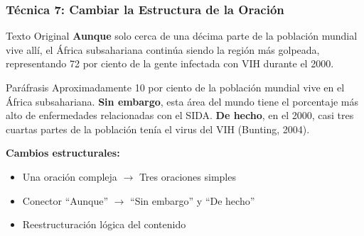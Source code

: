 \documentclass[aspectratio=169]{beamer}
\begin{document}
\begin{frame}
	\frametitle{Técnica 7: Cambiar la Estructura de la Oración}
	
	\begin{exampleblock}{Texto Original}
		\small
		\textbf{Aunque} solo cerca de una décima parte de la población mundial vive allí, el África subsahariana continúa siendo la región más golpeada, representando 72 por ciento de la gente infectada con VIH durante el 2000.
	\end{exampleblock}
	
	\vspace{0.5em}
	
	\begin{exampleblock}{Paráfrasis}
		\small
		Aproximadamente 10 por ciento de la población mundial vive en el África subsahariana. \textbf{Sin embargo}, esta área del mundo tiene el porcentaje más alto de enfermedades relacionadas con el SIDA. \textbf{De hecho}, en el 2000, casi tres cuartas partes de la población tenía el virus del VIH (Bunting, 2004).
	\end{exampleblock}
	
	\vspace{0.5em}
	
	\textbf{Cambios estructurales:}
	\begin{itemize}
		\item Una oración compleja $\rightarrow$ Tres oraciones simples
		\item Conector ``Aunque'' $\rightarrow$ ``Sin embargo'' y ``De hecho''
		\item Reestructuración lógica del contenido
	\end{itemize}
\end{frame}
\end{document}
